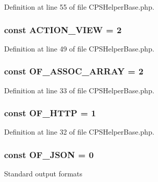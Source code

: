 Definition at line 55 of file CPSHelperBase.php.

\hypertarget{classCPSHelperBase_a264a8a0ead2c258c6ad9ce0f0968cd1b}{
\subsubsection[{ACTION\_\-VIEW}]{\setlength{\rightskip}{0pt plus 5cm}const {\bf ACTION\_\-VIEW} = 2}}
\label{classCPSHelperBase_a264a8a0ead2c258c6ad9ce0f0968cd1b}


Definition at line 49 of file CPSHelperBase.php.

\hypertarget{classCPSHelperBase_a9976081cc6341d651113d98adf880a7c}{
\subsubsection[{OF\_\-ASSOC\_\-ARRAY}]{\setlength{\rightskip}{0pt plus 5cm}const {\bf OF\_\-ASSOC\_\-ARRAY} = 2}}
\label{classCPSHelperBase_a9976081cc6341d651113d98adf880a7c}


Definition at line 33 of file CPSHelperBase.php.

\hypertarget{classCPSHelperBase_ad861d7e1882caed33177c62354962537}{
\subsubsection[{OF\_\-HTTP}]{\setlength{\rightskip}{0pt plus 5cm}const {\bf OF\_\-HTTP} = 1}}
\label{classCPSHelperBase_ad861d7e1882caed33177c62354962537}


Definition at line 32 of file CPSHelperBase.php.

\hypertarget{classCPSHelperBase_ae216f8dc124162fce9c831581cccad38}{
\subsubsection[{OF\_\-JSON}]{\setlength{\rightskip}{0pt plus 5cm}const {\bf OF\_\-JSON} = 0}}
\label{classCPSHelperBase_ae216f8dc124162fce9c831581cccad38}
Standard output formats 

